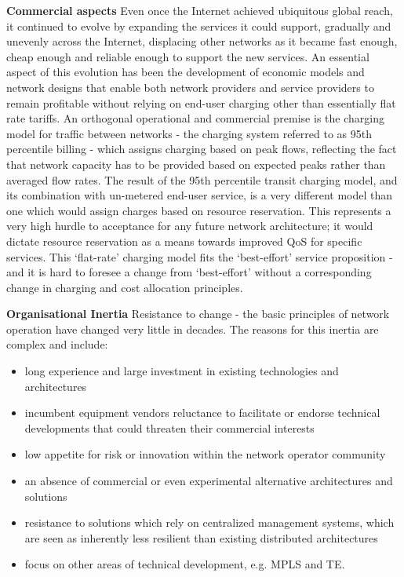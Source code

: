 
\textbf{Commercial aspects}
Even once the Internet achieved ubiquitous global reach, it continued to evolve by expanding the services it could support, gradually and unevenly across the Internet, displacing other networks as it became fast enough, cheap enough and reliable enough to support the new services.
An essential aspect of this evolution has been the development of economic models and network designs that enable both network providers and service providers to remain profitable without relying on end-user charging other than essentially flat rate tariffs.
An orthogonal operational and commercial premise is the charging model for traffic between networks - the charging system referred to as 95th percentile billing - which assigns charging based on peak flows, reflecting the fact that network capacity has to be provided based on expected peaks rather than averaged flow rates.
The result of the 95th percentile transit charging model, and its combination with un-metered end-user service, is a very different model than one which would assign charges based on resource reservation. This represents a very high hurdle to acceptance for any future network architecture; it would dictate resource reservation as a means towards improved QoS for specific services.
This ‘flat-rate’ charging model fits the ‘best-effort’ service proposition - and it is hard to foresee a change from ‘best-effort’ without a corresponding change in charging and cost allocation principles.
\medskip

\textbf{Organisational Inertia}
Resistance to change - the basic principles of network operation have changed very little in decades.
The reasons for this inertia are complex and include:
\begin{itemize}[noitemsep,nolistsep]
	\item{long experience and large investment in existing technologies and architectures}
	\item{incumbent equipment vendors reluctance to facilitate or endorse technical developments that could threaten their commercial interests}
	\item{low appetite for risk or innovation within the network operator community}
	\item{an absence of commercial or even experimental alternative architectures and solutions}
	\item{resistance to solutions which rely on centralized management systems, which are seen as inherently less resilient than existing distributed architectures}
	\item{focus on other areas of technical development, e.g. MPLS and TE.}
	\medskip
\end{itemize}

